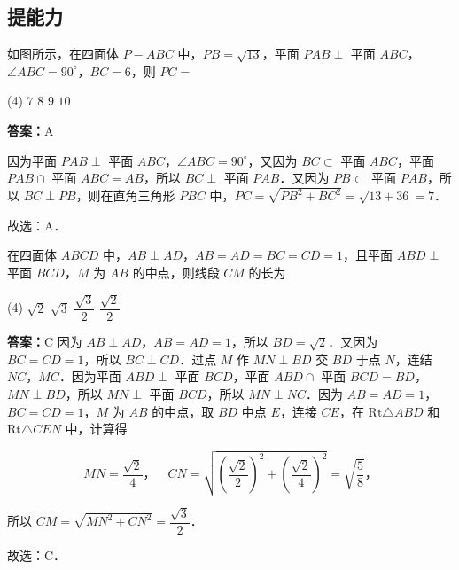 \vspace{2em}

\subsection{提能力}

\begin{example}[\bkstar{3}{5}]
如图所示，在四面体 $P-ABC$ 中，$PB=\sqrt{13}$，平面 $PAB\perp$ 平面 $ABC$，$\angle ABC=90^{\circ}$，$BC=6$，则 $PC=$
\begin{tasks}(4)
    \task $7$
    \task $8$
    \task $9$
    \task $10$
\end{tasks}
\end{example}
\begin{solution}
\textbf{答案：}A

因为平面 $PAB\perp$ 平面 $ABC$，$\angle ABC=90^{\circ}$，又因为 $BC\subset$ 平面 $ABC$，平面 $PAB\cap$ 平面 $ABC=AB$，所以 $BC\perp$ 平面 $PAB$．又因为 $PB\subset$ 平面 $PAB$，所以 $BC\perp PB$，则在直角三角形 $PBC$ 中，$PC=\sqrt{PB^2+BC^2}=\sqrt{13+36}=7$．

故选：A．
\end{solution}

\vspace{2em}

\begin{example}[\bkstar{3}{5}]
在四面体 $ABCD$ 中，$AB\perp AD$，$AB=AD=BC=CD=1$，且平面 $ABD\perp$ 平面 $BCD$，$M$ 为 $AB$ 的中点，则线段 $CM$ 的长为
\begin{tasks}(4)
    \task $\sqrt{2}$
    \task $\sqrt{3}$
    \task $\dfrac{\sqrt{3}}{2}$
    \task $\dfrac{\sqrt{2}}{2}$
\end{tasks}
\end{example}
\begin{solution}
\textbf{答案：}C
因为 $AB\perp AD$，$AB=AD=1$，所以 $BD=\sqrt{2}$．又因为 $BC=CD=1$，所以 $BC\perp CD$．过点 $M$ 作 $MN\perp BD$ 交 $BD$ 于点 $N$，连结 $NC$，$MC$．因为平面 $ABD\perp$ 平面 $BCD$，平面 $ABD\cap$ 平面 $BCD=BD$，$MN\perp BD$，所以 $MN\perp$ 平面 $BCD$，所以 $MN\perp NC$．因为 $AB=AD=1$，$BC=CD=1$，$M$ 为 $AB$ 的中点，取 $BD$ 中点 $E$，连接 $CE$，在 $\text{Rt}\triangle ABD$ 和 $\text{Rt}\triangle CEN$ 中，计算得

$$
MN=\frac{\sqrt{2}}{4}\text{，}\quad CN=\sqrt{\left(\frac{\sqrt{2}}{2}\right)^2+\left(\frac{\sqrt{2}}{4}\right)^2}=\sqrt{\frac{5}{8}}\text{，}
$$

所以 $CM=\sqrt{MN^2+CN^2}=\dfrac{\sqrt{3}}{2}$．

故选：C．
\end{solution}

